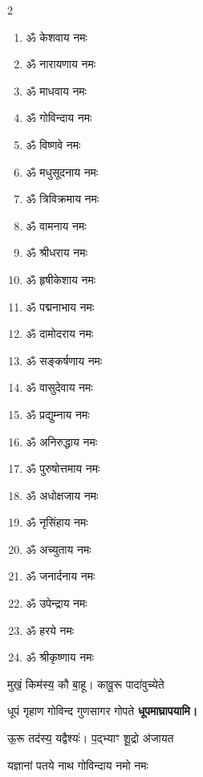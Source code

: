\begin{center}
\begin{multicols}{2}
\begin{enumerate}
\item ॐ केशवाय नमः
\item ॐ नारायणाय नमः
\item ॐ माधवाय नमः
\item ॐ गोविन्दाय नमः
\item ॐ विष्णवे नमः
\item ॐ मधुसूदनाय नमः
\item ॐ त्रिविक्रमाय नमः
\item ॐ वामनाय नमः
\item ॐ श्रीधराय नमः
\item ॐ हृषीकेशाय नमः
\item ॐ पद्मनाभाय नमः
\item ॐ दामोदराय नमः
\item ॐ सङ्कर्षणाय नमः
\item ॐ वासुदेवाय नमः
\item ॐ प्रद्युम्नाय नमः
\item ॐ अनिरुद्धाय नमः
\item ॐ पुरुषोत्तमाय नमः
\item ॐ अधोक्षजाय नमः
\item ॐ नृसिंहाय नमः
\item ॐ अच्युताय नमः
\item ॐ जनार्दनाय नमः
\item ॐ उपेन्द्राय नमः
\item ॐ हरये नमः
\item ॐ श्रीकृष्णाय नमः
\end{enumerate}
\end{multicols}

\begingroup
\centering
\setlength{\columnseprule}{1pt}
\let\chapt\sect
\needspace{6em}

\endgroup


{मुखं॒ किम॑स्य॒ कौ बा॒हू। कावू॒रू पादा॑वुच्येते}

{धूपं गृहाण गोविन्द गुणसागर गोपते}
\textbf{\devAya{} धूपमाघ्रापयामि।}
\medskip

{ऊ॒रू तद॑स्य॒ यद्वैश्यः॑। प॒द्भ्याꣳ शू॒द्रो अ॑जायत}

{यज्ञानां पतये नाथ गोविन्दाय नमो नमः}


\end{center}
